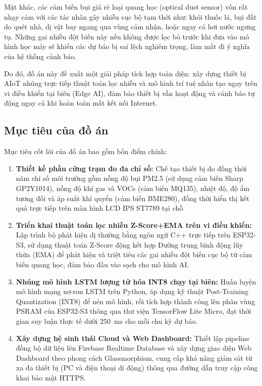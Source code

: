 \documentclass[12pt,a4paper]{article}
\begin{document}
Mặt khác, các cảm biến bụi giá rẻ loại quang học (optical dust sensor) vốn rất nhạy cảm với các tác nhân gây nhiễu cục bộ tạm thời như: khói thuốc lá, bụi đất do quét nhà, dị vật bay ngang qua vùng cảm nhận, hoặc ngay cả hơi nước ngưng tụ. Những gai nhiễu đột biến này nếu không được lọc bỏ trước khi đưa vào mô hình học máy sẽ khiến các dự báo bị sai lệch nghiêm trọng, làm mất đi ý nghĩa của hệ thống cảnh báo.

Do đó, đồ án này đề xuất một giải pháp tích hợp toàn diện: xây dựng thiết bị AIoT nhúng trực tiếp thuật toán lọc nhiễu và mô hình trí tuệ nhân tạo ngay trên vi điều khiển tại biên (Edge AI), đảm bảo thiết bị vẫn hoạt động và cảnh báo tự động ngay cả khi hoàn toàn mất kết nối Internet.

\subsection{Mục tiêu của đồ án}

Mục tiêu cốt lõi của đồ án bao gồm bốn điểm chính:

\begin{enumerate}[label=\textbf{\arabic*.}]
    \item \textbf{Thiết kế phần cứng trạm đo đa chỉ số:} Chế tạo thiết bị đo đồng thời năm chỉ số môi trường gồm nồng độ bụi PM2.5 (sử dụng cảm biến Sharp GP2Y1014), nồng độ khí gas và VOCs (cảm biến MQ135), nhiệt độ, độ ẩm tương đối và áp suất khí quyển (cảm biến BME280), đồng thời hiển thị kết quả trực tiếp trên màn hình LCD IPS ST7789 tại chỗ.

    \item \textbf{Triển khai thuật toán lọc nhiễu Z-Score+EMA trên vi điều khiển:} Lập trình bộ phát hiện dị thường bằng ngôn ngữ C++ trực tiếp trên ESP32-S3, sử dụng thuật toán Z-Score động kết hợp Đường trung bình động lũy thừa (EMA) để phát hiện và triệt tiêu các gai nhiễu đột biến cục bộ từ cảm biến quang học, đảm bảo đầu vào sạch cho mô hình AI.

    \item \textbf{Nhúng mô hình LSTM lượng tử hóa INT8 chạy tại biên:} Huấn luyện mô hình mạng nơ-ron LSTM trên Python, áp dụng kỹ thuật Post-Training Quantization (INT8) để nén mô hình, rồi tích hợp thành công lên phân vùng PSRAM của ESP32-S3 thông qua thư viện TensorFlow Lite Micro, đạt thời gian suy luận thực tế dưới $250$~ms cho mỗi chu kỳ dự báo.

    \item \textbf{Xây dựng hệ sinh thái Cloud và Web Dashboard:} Thiết lập pipeline đồng bộ dữ liệu lên Firebase Realtime Database và xây dựng giao diện Web Dashboard theo phong cách Glassmorphism, cung cấp khả năng giám sát từ xa đa thiết bị (PC và điện thoại di động) thông qua đường dẫn truy cập công khai bảo mật HTTPS.
\end{enumerate}
\end{document}
